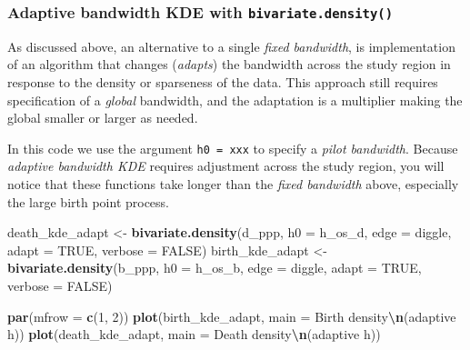\documentclass[
]{book}
\newenvironment{Shaded}{\begin{snugshade}}{\end{snugshade}}
\newcommand{\AttributeTok}[1]{\textcolor[rgb]{0.13,0.29,0.53}{#1}}
\newcommand{\ConstantTok}[1]{\textcolor[rgb]{0.56,0.35,0.01}{#1}}
\newcommand{\DecValTok}[1]{\textcolor[rgb]{0.00,0.00,0.81}{#1}}
\newcommand{\FunctionTok}[1]{\textcolor[rgb]{0.13,0.29,0.53}{\textbf{#1}}}
\newcommand{\NormalTok}[1]{#1}
\newcommand{\OtherTok}[1]{\textcolor[rgb]{0.56,0.35,0.01}{#1}}
\newcommand{\SpecialCharTok}[1]{\textcolor[rgb]{0.81,0.36,0.00}{\textbf{#1}}}
\newcommand{\StringTok}[1]{\textcolor[rgb]{0.31,0.60,0.02}{#1}}
\begin{document}
\hypertarget{adaptive-bandwidth-kde-with-bivariate.density}{%
\subsubsection{\texorpdfstring{Adaptive bandwidth KDE with \texttt{bivariate.density()}}{Adaptive bandwidth KDE with bivariate.density()}}\label{adaptive-bandwidth-kde-with-bivariate.density}}

As discussed above, an alternative to a single \emph{fixed bandwidth}, is implementation of an algorithm that changes (\emph{adapts}) the bandwidth across the study region in response to the density or sparseness of the data. This approach still requires specification of a \emph{global} bandwidth, and the adaptation is a multiplier making the global smaller or larger as needed.

In this code we use the argument \texttt{h0\ =\ xxx} to specify a \emph{pilot bandwidth}. Because \emph{adaptive bandwidth KDE} requires adjustment across the study region, you will notice that these functions take longer than the \emph{fixed bandwidth} above, especially the large birth point process.

\begin{Shaded}
\begin{Highlighting}[]
\NormalTok{death\_kde\_adapt }\OtherTok{\textless{}{-}} \FunctionTok{bivariate.density}\NormalTok{(d\_ppp, }
                                     \AttributeTok{h0 =}\NormalTok{ h\_os\_d, }
                                     \AttributeTok{edge =} \StringTok{\textquotesingle{}diggle\textquotesingle{}}\NormalTok{, }
                                     \AttributeTok{adapt =} \ConstantTok{TRUE}\NormalTok{,}
                                     \AttributeTok{verbose =} \ConstantTok{FALSE}\NormalTok{)}
\NormalTok{birth\_kde\_adapt }\OtherTok{\textless{}{-}} \FunctionTok{bivariate.density}\NormalTok{(b\_ppp, }
                                     \AttributeTok{h0 =}\NormalTok{ h\_os\_b, }
                                     \AttributeTok{edge =} \StringTok{\textquotesingle{}diggle\textquotesingle{}}\NormalTok{,}
                                     \AttributeTok{adapt =} \ConstantTok{TRUE}\NormalTok{,}
                                     \AttributeTok{verbose =} \ConstantTok{FALSE}\NormalTok{)}
\end{Highlighting}
\end{Shaded}

\begin{Shaded}
\begin{Highlighting}[]
\FunctionTok{par}\NormalTok{(}\AttributeTok{mfrow =} \FunctionTok{c}\NormalTok{(}\DecValTok{1}\NormalTok{, }\DecValTok{2}\NormalTok{))}
\FunctionTok{plot}\NormalTok{(birth\_kde\_adapt, }\AttributeTok{main =} \StringTok{\textquotesingle{}Birth density}\SpecialCharTok{\textbackslash{}n}\StringTok{(adaptive h)\textquotesingle{}}\NormalTok{)}
\FunctionTok{plot}\NormalTok{(death\_kde\_adapt, }\AttributeTok{main =} \StringTok{\textquotesingle{}Death density}\SpecialCharTok{\textbackslash{}n}\StringTok{(adaptive h)\textquotesingle{}}\NormalTok{)}
\end{Highlighting}
\end{Shaded}
\end{document}

